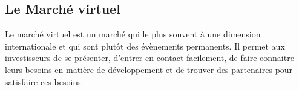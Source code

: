 \subsection{Le Marché virtuel}



Le marché virtuel est un marché qui le plus souvent à une dimension internationale et qui sont plutôt des évènements permanents. Il permet aux investisseurs de se présenter, d’entrer en contact facilement, de faire connaitre leurs besoins en matière de développement et de trouver des partenaires pour satisfaire ces besoins.